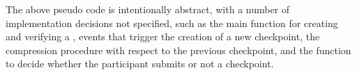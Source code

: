 
The above pseudo code is intentionally abstract, with a number of implementation decisions not specified, such as the main function for creating and verifying a \prf, events that trigger the creation of a new checkpoint, the compression procedure with respect to the previous checkpoint, and the \ssc function to decide whether the participant submits or not a checkpoint. 

